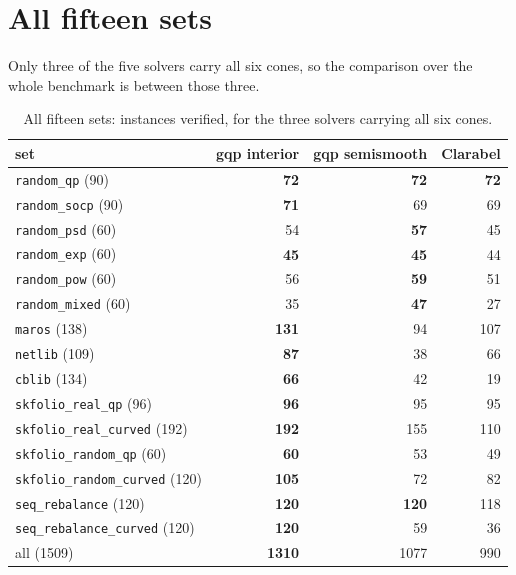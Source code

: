 \documentclass[a4paper,11pt]{book}
\theoremstyle{plain}
\theoremstyle{definition}
\theoremstyle{remark}
\numberwithin{equation}{chapter}
\numberwithin{algorithm}{chapter}
\begin{document}
	

	\section{All fifteen sets}

	Only three of the five solvers carry all six cones, so the comparison over the
	whole benchmark is between those three.

	\begin{table}[H]
		\centering\small
		\begin{tabular}{lrrr}
			\toprule
			set & gqp interior & gqp semismooth & Clarabel\\
			\midrule
			\texttt{random\_qp} (90)             & \textbf{72} & \textbf{72} & \textbf{72}\\
			\texttt{random\_socp} (90)           & \textbf{71} & 69 & 69\\
			\texttt{random\_psd} (60)            & 54 & \textbf{57} & 45\\
			\texttt{random\_exp} (60)            & \textbf{45} & \textbf{45} & 44\\
			\texttt{random\_pow} (60)            & 56 & \textbf{59} & 51\\
			\texttt{random\_mixed} (60)          & 35 & \textbf{47} & 27\\
			\texttt{maros} (138)                 & \textbf{131} & 94 & 107\\
			\texttt{netlib} (109)                & \textbf{87} & 38 & 66\\
			\texttt{cblib} (134)                 & \textbf{66} & 42 & 19\\
			\texttt{skfolio\_real\_qp} (96)      & \textbf{96} & 95 & 95\\
			\texttt{skfolio\_real\_curved} (192) & \textbf{192} & 155 & 110\\
			\texttt{skfolio\_random\_qp} (60)    & \textbf{60} & 53 & 49\\
			\texttt{skfolio\_random\_curved} (120) & \textbf{105} & 72 & 82\\
			\texttt{seq\_rebalance} (120)        & \textbf{120} & \textbf{120} & 118\\
			\texttt{seq\_rebalance\_curved} (120) & \textbf{120} & 59 & 36\\
			\midrule
			all (1509)                           & \textbf{1310} & 1077 & 990\\
			\bottomrule
		\end{tabular}
		\caption{All fifteen sets: instances verified, for the three solvers
			carrying all six cones.}
	\end{table}
\end{document}
